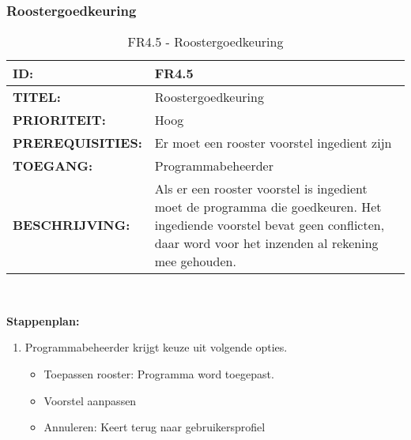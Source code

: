 \subsubsection{Roostergoedkeuring}
\noindent\begin{table}[H]
            \begin{tabular}{l | p{10cm}}
                \textbf{ID:} & FR4.5 \\ \hline
                \textbf{TITEL:} & Roostergoedkeuring\\ \hline
                \textbf{PRIORITEIT:} & Hoog \\ \hline
                \textbf{PREREQUISITIES:} & Er moet een rooster voorstel ingedient zijn\\ \hline
                \textbf{TOEGANG:} & Programmabeheerder \\ \hline
                \textbf{BESCHRIJVING:} & Als er een rooster voorstel is ingedient moet de programma die goedkeuren. Het ingediende voorstel bevat geen conflicten, daar word voor het inzenden al rekening mee gehouden.
            \end{tabular}\\
            \caption{FR4.5 - Roostergoedkeuring}
            \label{tab:FR4.5 - Roostergoedkeuring}
        \end{table}

\textbf{Stappenplan:}
	\begin{enumerate}
	\item Programmabeheerder krijgt keuze uit volgende opties.
		\begin{itemize}
		\item Toepassen rooster: Programma word toegepast. 
		\item Voorstel aanpassen 
		\item Annuleren: Keert terug naar gebruikersprofiel 
		\end{itemize}
	\end{enumerate}		
		
